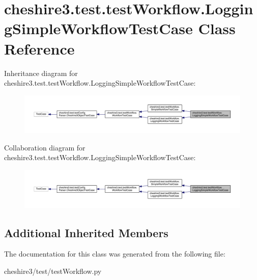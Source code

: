 \hypertarget{classcheshire3_1_1test_1_1test_workflow_1_1_logging_simple_workflow_test_case}{\section{cheshire3.\-test.\-test\-Workflow.\-Logging\-Simple\-Workflow\-Test\-Case Class Reference}
\label{classcheshire3_1_1test_1_1test_workflow_1_1_logging_simple_workflow_test_case}
}


Inheritance diagram for cheshire3.\-test.\-test\-Workflow.\-Logging\-Simple\-Workflow\-Test\-Case\-:
\nopagebreak
\begin{figure}[H]
\begin{center}
\leavevmode
\includegraphics[width=350pt]{classcheshire3_1_1test_1_1test_workflow_1_1_logging_simple_workflow_test_case__inherit__graph}
\end{center}
\end{figure}


Collaboration diagram for cheshire3.\-test.\-test\-Workflow.\-Logging\-Simple\-Workflow\-Test\-Case\-:
\nopagebreak
\begin{figure}[H]
\begin{center}
\leavevmode
\includegraphics[width=350pt]{classcheshire3_1_1test_1_1test_workflow_1_1_logging_simple_workflow_test_case__coll__graph}
\end{center}
\end{figure}
\subsection*{Additional Inherited Members}


The documentation for this class was generated from the following file\-:\begin{DoxyCompactItemize}
\item 
cheshire3/test/test\-Workflow.\-py\end{DoxyCompactItemize}
